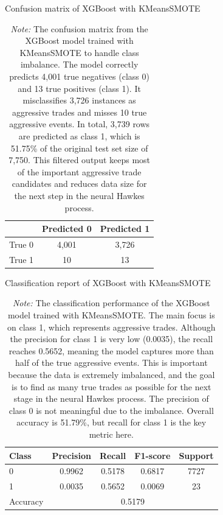\begin{table}[H]
    \centering
    \caption{Confusion matrix of XGBoost with KMeansSMOTE}
    \caption*{\textit{Note:} The confusion matrix from the XGBoost model trained with KMeansSMOTE to handle class imbalance. The model correctly predicts 4,001 true negatives (class 0) and 13 true positives (class 1). It misclassifies 3,726 instances as aggressive trades and misses 10 true aggressive events. In total, 3,739 rows are predicted as class 1, which is 51.75\% of the original test set size of 7,750. This filtered output keeps most of the important aggressive trade candidates and reduces data size for the next step in the neural Hawkes process.}
    \label{tab:xgb-confusion-km}
    \begin{tabular}{lcc}
        \toprule
        & Predicted 0 & Predicted 1 \\
        \midrule
        True 0 & 4,001 & 3,726 \\
        True 1 & 10 & 13 \\
        \bottomrule
    \end{tabular}
\end{table}

\begin{table}[H]
    \centering
    \caption{Classification report of XGBoost with KMeansSMOTE}
    \caption*{\textit{Note:} The classification performance of the XGBoost model trained with KMeansSMOTE. The main focus is on class 1, which represents aggressive trades. Although the precision for class 1 is very low (0.0035), the recall reaches 0.5652, meaning the model captures more than half of the true aggressive events. This is important because the data is extremely imbalanced, and the goal is to find as many true trades as possible for the next stage in the neural Hawkes process. The precision of class 0 is not meaningful due to the imbalance. Overall accuracy is 51.79\%, but recall for class 1 is the key metric here.}

    \label{tab:xgb-classification-report-km}
    \begin{tabular}{lcccc}
        \toprule
        Class & Precision & Recall & F1-score & Support \\
        \midrule
        0 & 0.9962 & 0.5178 & 0.6817 & 7727 \\
        1 & 0.0035 & 0.5652 & 0.0069 & 23 \\
        \midrule
        Accuracy & \multicolumn{4}{c}{0.5179} \\
        \bottomrule
    \end{tabular}
\end{table}

